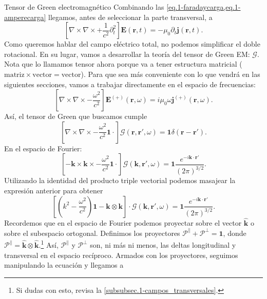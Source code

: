 \begin{example}
    {Tensor de Green electromagnético
    \label{ej.1-tensorgreen_vacio}}
    Combinando las \cref{eq.1-faradaycarga,eq.1-amperecarga} llegamos, antes de seleccionar la parte transversal, a
    \begin{equation}
        \left[\nabla\times\nabla\times + \frac{1}{c^2}\partial_t^2\right]\mathbf{E}(\mathbf{r}, t) = - \mu_0\partial_t \mathbf{j}(\mathbf{r}, t).
    \end{equation}
    Como queremos hablar del campo eléctrico total, no podemos simplificar el doble rotacional. En su lugar, vamos a desarrollar la teoría del tensor de Green EM: \(\boldsymbol{\mathcal{G}}\). Nota que lo llamamos tensor ahora porque va a tener estructura matricial (\(\text{matriz}\times\text{vector}=\text{vector}\)). Para que sea más conveniente con lo que vendrá en las siguientes secciones, vamos a trabajar directamente en el espacio de frecuencias:
    \begin{equation*}
        \left[\nabla\times\nabla\times - \frac{\omega^2}{c^2}\right]\mathbf{E}^{(+)}(\mathbf{r}, \omega) = i\mu_0 \omega\mathbf{j}^{(+)}(\mathbf{r}, \omega).
    \end{equation*}
    Así, el tensor de Green que buscamos cumple
    \begin{equation}
        \left[\nabla\times\nabla\times - \frac{\omega^2}{c^2}\mathbf{1}\cdot\right]\boldsymbol{\mathcal{G}}(\mathbf{r}, \mathbf{r}', \omega) = \mathbf{1}\delta(\mathbf{r}-\mathbf{r}').
    \end{equation}
    En el espacio de Fourier:
    \begin{equation*}
        \left[-\mathbf{k}\times\mathbf{k}\times - \frac{\omega^2}{c^2}\mathbf{1}\cdot\right]\boldsymbol{\mathcal{G}}(\mathbf{k}, \mathbf{r}', \omega) = \mathbf{1}\frac{e^{-i\mathbf{k}\cdot\mathbf{r}'}}{(2\pi)^{3/2}}.
    \end{equation*}
    Utilizando la identidad del producto triple vectorial podemos masajear la expresión anterior para obtener
    \begin{equation*}
        \left[\left(k^2 - \frac{\omega^2}{c^2}\right)\mathbf{1} - \mathbf{k}\otimes\mathbf{k}\right]\cdot\boldsymbol{\mathcal{G}}(\mathbf{k}, \mathbf{r}', \omega) = \mathbf{1}\frac{e^{-i\mathbf{k}\cdot\mathbf{r}'}}{(2\pi)^{3/2}}.
    \end{equation*}
    Recordemos que en el espacio de Fourier podemos proyectar sobre el vector \(\hat{\mathbf{k}}\) o sobre el subespacio ortogonal. Definimos los proyectores \(\boldsymbol{\mathcal{P}}^\parallel + \boldsymbol{\mathcal{P}}^\perp = \mathbf{1}\), donde \(\boldsymbol{\mathcal{P}}^\parallel = \hat{\mathbf{k}}\otimes\hat{\mathbf{k}}\).\footnote{Si dudas con esto, revisa la \cref{subsubsec.1-campos_transversales}.} Así, \(\boldsymbol{\mathcal{P}}^\parallel\) y \(\boldsymbol{\mathcal{P}}^\perp\) son, ni más ni menos, las deltas longitudinal y transversal en el espacio recíproco. Armados con los proyectores, seguimos manipulando la ecuación y llegamos a 

\end{example}
